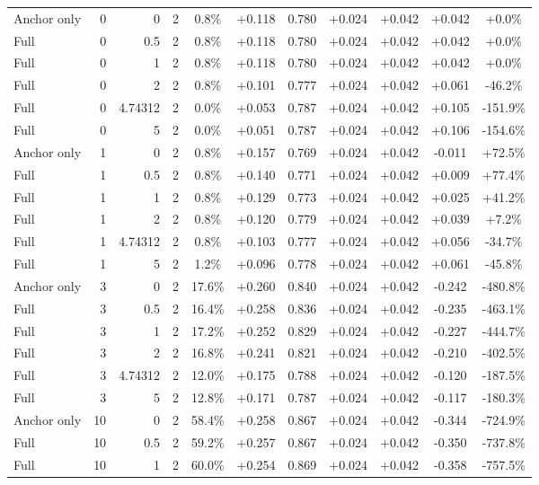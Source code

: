 \begin{table}[htbp]
\begin{tabular}{lrrrccccccc}
Anchor only & 0 & 0 & 2 & 0.8\% & +0.118 & 0.780 & +0.024 & +0.042 & +0.042 & +0.0\% \\
Full & 0 & 0.5 & 2 & 0.8\% & +0.118 & 0.780 & +0.024 & +0.042 & +0.042 & +0.0\% \\
Full & 0 & 1 & 2 & 0.8\% & +0.118 & 0.780 & +0.024 & +0.042 & +0.042 & +0.0\% \\
Full & 0 & 2 & 2 & 0.8\% & +0.101 & 0.777 & +0.024 & +0.042 & +0.061 & -46.2\% \\
Full & 0 & 4.74312 & 2 & 0.0\% & +0.053 & 0.787 & +0.024 & +0.042 & +0.105 & -151.9\% \\
Full & 0 & 5 & 2 & 0.0\% & +0.051 & 0.787 & +0.024 & +0.042 & +0.106 & -154.6\% \\
Anchor only & 1 & 0 & 2 & 0.8\% & +0.157 & 0.769 & +0.024 & +0.042 & -0.011 & +72.5\% \\
Full & 1 & 0.5 & 2 & 0.8\% & +0.140 & 0.771 & +0.024 & +0.042 & +0.009 & +77.4\% \\
Full & 1 & 1 & 2 & 0.8\% & +0.129 & 0.773 & +0.024 & +0.042 & +0.025 & +41.2\% \\
Full & 1 & 2 & 2 & 0.8\% & +0.120 & 0.779 & +0.024 & +0.042 & +0.039 & +7.2\% \\
Full & 1 & 4.74312 & 2 & 0.8\% & +0.103 & 0.777 & +0.024 & +0.042 & +0.056 & -34.7\% \\
Full & 1 & 5 & 2 & 1.2\% & +0.096 & 0.778 & +0.024 & +0.042 & +0.061 & -45.8\% \\
Anchor only & 3 & 0 & 2 & 17.6\% & +0.260 & 0.840 & +0.024 & +0.042 & -0.242 & -480.8\% \\
Full & 3 & 0.5 & 2 & 16.4\% & +0.258 & 0.836 & +0.024 & +0.042 & -0.235 & -463.1\% \\
Full & 3 & 1 & 2 & 17.2\% & +0.252 & 0.829 & +0.024 & +0.042 & -0.227 & -444.7\% \\
Full & 3 & 2 & 2 & 16.8\% & +0.241 & 0.821 & +0.024 & +0.042 & -0.210 & -402.5\% \\
Full & 3 & 4.74312 & 2 & 12.0\% & +0.175 & 0.788 & +0.024 & +0.042 & -0.120 & -187.5\% \\
Full & 3 & 5 & 2 & 12.8\% & +0.171 & 0.787 & +0.024 & +0.042 & -0.117 & -180.3\% \\
Anchor only & 10 & 0 & 2 & 58.4\% & +0.258 & 0.867 & +0.024 & +0.042 & -0.344 & -724.9\% \\
Full & 10 & 0.5 & 2 & 59.2\% & +0.257 & 0.867 & +0.024 & +0.042 & -0.350 & -737.8\% \\
Full & 10 & 1 & 2 & 60.0\% & +0.254 & 0.869 & +0.024 & +0.042 & -0.358 & -757.5\% \\

\end{tabular}
\end{table}
